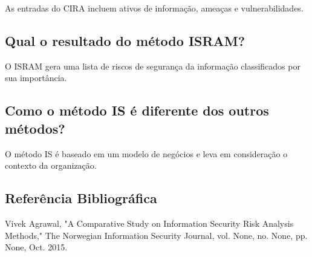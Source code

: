 \documentclass[a4paper,12pt]{report}
\begin{document}
As entradas do CIRA incluem ativos de informação, ameaças e vulnerabilidades.

\subsection{Qual o resultado do método ISRAM?}

O ISRAM gera uma lista de riscos de segurança da informação classificados por sua importância.

\subsection{Como o método IS é diferente dos outros métodos?}

O método IS é baseado em um modelo de negócios e leva em consideração o contexto da organização.

\subsection*{Referência Bibliográfica}

Vivek Agrawal, "A Comparative Study on Information Security Risk Analysis Methods," The Norwegian Information Security Journal, vol. None, no. None, pp. None, Oct. 2015.

\end{document}
